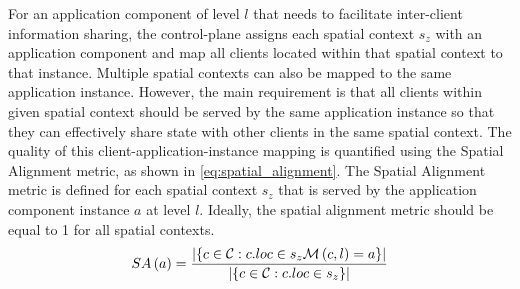 For an application component of level $l$ that needs to facilitate inter-client information sharing, the control-plane assigns each spatial context $s_z$ with an application component and map all clients located within that spatial context to that instance. Multiple spatial contexts can also be mapped to the same application instance. However, the main requirement is that all clients within given spatial context should be served by the same application instance so that they can effectively share state with other clients in the same spatial context. The quality of this client-application-instance mapping is quantified using the Spatial Alignment metric, as shown in \cref{eq:spatial_alignment}. The Spatial Alignment metric is defined for each spatial context $s_z$ that is served by the application component instance $a$ at level $l$.  Ideally, the spatial alignment metric should be equal to 1 for all spatial contexts.
\begin{equation}
\label{eq:spatial_alignment}
SA \left( a \right) = \dfrac{|\{ c \in \mathcal{C} : c.loc \in s_z   \mathcal{M} \left( c, l\right) = a \}|}{|\{ c \in \mathcal{C} : c.loc \in s_z \}|}
\end{equation}


